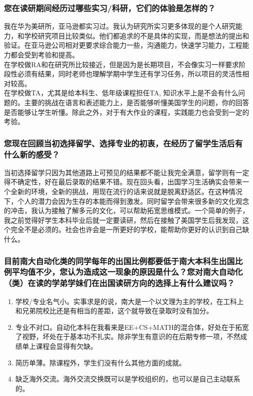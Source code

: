 \documentclass[a4paper,UTF8]{book}
\begin{document}
    \subsubsection*{您在读研期间经历过哪些实习/科研，它们的体验是怎样的？}
    我在华为美研所，亚马逊都实习过。我认为研究所实习更多体现的是个人研究能力，和学校研究项目比较类似。他们都追求的不是具体的实现，而是想法的提出和验证。在亚马逊公司相对更要求综合能力一些，沟通能力，快速学习能力，工程能力都会受到考验和提高。\\
    在学校做RA和在研究所比较接近，但是因为是长期项目，不会像实习一样要求阶段性必须有结果，同时老师也理解学期中学生还有学习任务，所以项目的灵活性相对较高。\\
    在学校做TA，尤其是给本科生、低年级课程担任TA, 知识水平上是不会有什么问题的。主要的挑战在语言和表述能力上，是否能够听懂美国学生的问题，你的回答是否能够让学生听懂。除此之外，对于有大作业的课程，实践能力也会受到一定的考验。
    
    \subsubsection*{您现在回顾当初选择留学、选择专业的初衷，在经历了留学生活后有什么新的感受？}
    当初选择留学只因为其他道路上可预见的结果都不能让我完全满意，留学则有一定得不确定性，好在最后录取的结果不错。现在回头看，出国学习生活确实会带来一个全新的环境，全新的挑战，用现在流行的话来说就是脱离舒适区。在这种情况下，个人的潜力会因为生存的本能而得到激发。同时留学会带来很多新的文化观念的冲击，我认为接触了解多元的文化，可以帮助拓宽思维模式。一个简单的例子，我之前觉得好学生本科毕业后就一定要读研，然后在接触了美国学生后我发现，这个完全不是必须的。社会也许会是一所更好的学校，能帮助你更好的认识到自己缺什么。

    \subsubsection*{目前南大自动化类的同学每年的出国比例都要低于南大本科生出国比例平均值不少，您认为造成这一现象的原因是什么？您对南大自动化（类）在读的学弟学妹们在出国读研方向的选择上有什么建议吗？}
        \begin{enumerate}[itemindent=0pt,itemsep=0pt,parsep=0pt]
            \item 学校/专业名气小。实事求是的说，南大是一个以文理为主的学校，在工科上和兄弟院校比还是有相当的差距，这个就导致在录取时没有加分。
            \item 专业不对口。自动化本科在我看来是EE+CS+MATH的混合体，好处在于拓宽了视野，坏处在于基本功不扎实。除非学生有意识的在后期专修一项，不然成绩单上课程会显得有欠缺。
            \item 简历单薄。除课程外，学生们没有什么其他方面的成就。
            \item 缺乏海外交流。海外交流交换既可以是学校组织的，也可以是自己主动联系的。
        \end{enumerate}
\end{document}
